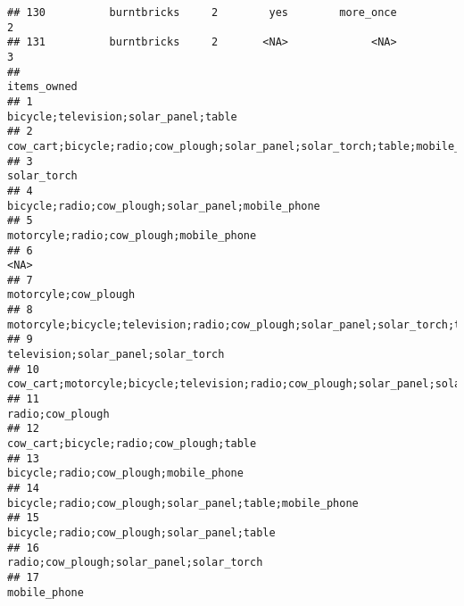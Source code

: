 \documentclass[
]{article}
\begin{document}
\begin{verbatim}
## 130          burntbricks     2        yes        more_once         2
## 131          burntbricks     2       <NA>             <NA>         3
##                                                                                                                                  items_owned
## 1                                                                                                       bicycle;television;solar_panel;table
## 2                                                               cow_cart;bicycle;radio;cow_plough;solar_panel;solar_torch;table;mobile_phone
## 3                                                                                                                                solar_torch
## 4                                                                                          bicycle;radio;cow_plough;solar_panel;mobile_phone
## 5                                                                                                    motorcyle;radio;cow_plough;mobile_phone
## 6                                                                                                                                       <NA>
## 7                                                                                                                       motorcyle;cow_plough
## 8                                                         motorcyle;bicycle;television;radio;cow_plough;solar_panel;solar_torch;table;fridge
## 9                                                                                                         television;solar_panel;solar_torch
## 10                                                      cow_cart;motorcyle;bicycle;television;radio;cow_plough;solar_panel;solar_torch;table
## 11                                                                                                                          radio;cow_plough
## 12                                                                                                   cow_cart;bicycle;radio;cow_plough;table
## 13                                                                                                     bicycle;radio;cow_plough;mobile_phone
## 14                                                                                   bicycle;radio;cow_plough;solar_panel;table;mobile_phone
## 15                                                                                                bicycle;radio;cow_plough;solar_panel;table
## 16                                                                                                  radio;cow_plough;solar_panel;solar_torch
## 17                                                                                                                              mobile_phone

\end{verbatim}
\end{document}
